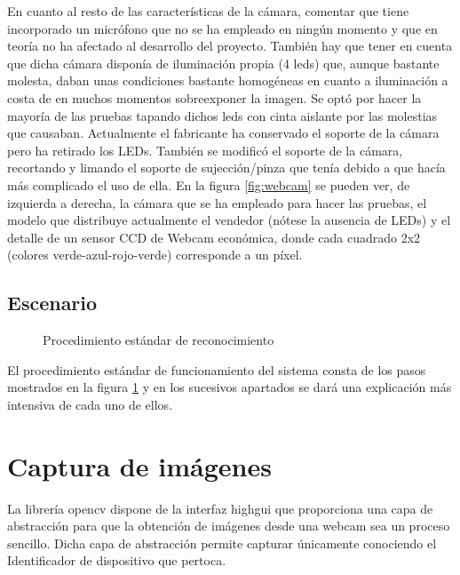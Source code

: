 En cuanto al resto de las características de la cámara, comentar que tiene incorporado un micrófono que no se ha empleado en ningún momento y que en teoría no ha afectado al desarrollo del proyecto. También hay que tener en cuenta que dicha cámara disponía de iluminación propia (4 leds) que, aunque bastante molesta, daban unas condiciones bastante homogéneas en cuanto a iluminación a costa de en muchos momentos sobreexponer la imagen. Se optó por hacer la mayoría de las pruebas tapando dichos leds con cinta aislante por las molestias que causaban. Actualmente el fabricante ha conservado el soporte de la cámara pero ha retirado los LEDs. También se modificó el soporte de la cámara, recortando y limando el soporte de sujección/pinza que tenía debido a que hacía más complicado el uso de ella. En la figura \ref{fig:webcam} se pueden ver, de izquierda a derecha, la cámara que se ha empleado para hacer las pruebas, el modelo que distribuye actualmente el vendedor (nótese la ausencia de LEDs) y el detalle de un sensor CCD de Webcam económica, donde cada cuadrado 2x2 (colores verde-azul-rojo-verde) corresponde a un píxel.

\subsection{Escenario}
\begin{figure}[h!]
        \centering
        
        \caption{Procedimiento estándar de reconocimiento}
	\label{fig:pasos_captura}
\end{figure}

El procedimiento estándar de funcionamiento del sistema consta de los pasos mostrados en la figura \ref{fig:pasos_captura} y en los sucesivos apartados se dará una explicación más intensiva de cada uno de ellos.

\newpage

\section{Captura de imágenes}
La librería opencv dispone de la interfaz highgui que proporciona una capa de abstracción para que la obtención de imágenes desde una webcam sea un proceso sencillo. Dicha capa de abstracción permite capturar únicamente conociendo el Identificador de dispositivo que pertoca.

